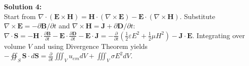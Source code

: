 \begin{solutionbox}
\vspace{0.3cm}
\textbf{Solution 4:}\\
Start from $\nabla \cdot (\mathbf{E} \times \mathbf{H}) = \mathbf{H} \cdot (\nabla \times \mathbf{E}) - \mathbf{E} \cdot (\nabla \times \mathbf{H})$. Substitute $\nabla \times \mathbf{E} = -\partial \mathbf{B}/\partial t$ and $\nabla \times \mathbf{H} = \mathbf{J} + \partial \mathbf{D}/\partial t$:
$\nabla \cdot \mathbf{S} = -\mathbf{H}\cdot\frac{\partial \mathbf{B}}{\partial t} - \mathbf{E}\cdot\frac{\partial \mathbf{D}}{\partial t} - \mathbf{E}\cdot\mathbf{J} = -\frac{\partial}{\partial t}\left(\frac{1}{2}\varepsilon E^2 + \frac{1}{2}\mu H^2\right) - \mathbf{J}\cdot\mathbf{E}$.
Integrating over volume $V$ and using Divergence Theorem yields $-\oiint_S \mathbf{S} \cdot d\mathbf{S} = \frac{\partial}{\partial t}\iiint_V u_{em} dV + \iiint_V \sigma E^2 dV$.
\end{solutionbox}
